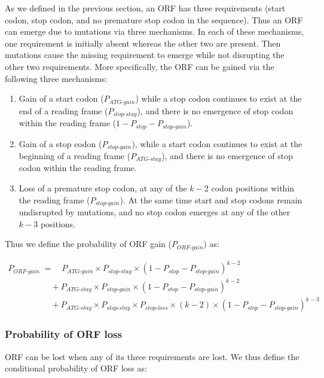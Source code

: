 \documentclass[12pt,a4paper]{article}
\begin{document}
As we defined in the previous section, an ORF has three requirements (start codon, stop codon, and no premature stop codon in the sequence). Thus an ORF can emerge due to mutations via three mechanisms. In each of these mechanisms, one requirement is initially absent whereas the other two are present. Then mutations cause the missing requirement to emerge while not disrupting the other two requirements. More specifically, the ORF can be gained via the following three mechanisms:
\begin{enumerate}
\item Gain of a start codon ($P_\textit{ATG-gain}$) while a stop codon continues to exist at the end of a reading frame ($P_\textit{stop-stay}$), and there is no emergence of stop codon within the reading frame ($1- P_\textit{stop} - P_\textit{stop-gain}$).
\item Gain of a stop codon ($P_\textit{stop-gain}$), while a start codon continues to exist at the beginning of a reading frame ($P_\textit{ATG-stay}$), and there is no emergence of stop codon within the reading frame.
\item Loss of a premature stop codon, at any of the $k-2$ codon positions within the reading frame ($P_\textit{stop-gain}$). At the same time start and stop codons remain undisrupted by mutations, and no stop codon emerges at any of the other $k-3$ positions.
\end{enumerate} 

Thus we define the probability of ORF gain ($P_\textit{ORF-gain}$) as:

\begin{align}
P_\textit{ORF-gain} & = \quad P_\textit{ATG-gain}\times P_\textit{stop-stay} \times (1- P_\textit{stop} - P_\textit{stop-gain})^{k-2} \nonumber \\[1pt]
& \quad + P_\textit{ATG-stay}\times P_\textit{stop-gain} \times (1- P_\textit{stop} - P_\textit{stop-gain})^{k-2} \nonumber \\[1pt]
& \quad + P_\textit{ATG-stay}\times P_\textit{stop-stay} \times P_\textit{stop-loss}\times(k-2) \times (1- P_\textit{stop} - P_\textit{stop-gain})^{k-3} 
\label{eqorfgain}
\end{align}

\subsubsection{Probability of ORF loss}

ORF can be lost when any of its three requirements are lost. We thus define the conditional probability of ORF loss as:
\end{document}
